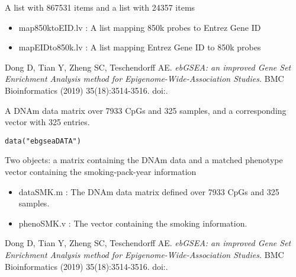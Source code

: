 \documentclass[letterpaper]{book}
\begin{document}
%
\begin{Format}
A list with 867531 items and a list with 24357 items
\end{Format}
%
\begin{Details}\relax
\begin{itemize}

\item{} map850ktoEID.lv : A list mapping 850k probes to Entrez Gene ID
\item{} mapEIDto850k.lv : A list mapping Entrez Gene ID to 850k probes

\end{itemize}

\end{Details}
%
\begin{References}\relax
Dong D, Tian Y, Zheng SC, Teschendorff AE.
\emph{ebGSEA: an improved Gene Set Enrichment Analysis method for Epigenome-Wide-Association Studies.}
BMC Bioinformatics (2019) 35(18):3514-3516.
doi:.
\end{References}
%
\begin{Description}\relax
A DNAm data matrix over 7933 CpGs and 325 samples, and a corresponding
vector with 325 entries.
\end{Description}
%
\begin{Usage}
\begin{verbatim}
data("ebgseaDATA")
\end{verbatim}
\end{Usage}
%
\begin{Format}
Two objects: a matrix containing the DNAm data and a matched phenotype
vector containing the smoking-pack-year information
\end{Format}
%
\begin{Details}\relax
\begin{itemize}

\item{} dataSMK.m : The DNAm data matrix defined over 7933 CpGs and 325 samples.
\item{} phenoSMK.v : The vector containing the smoking information.

\end{itemize}

\end{Details}
%
\begin{References}\relax
Dong D, Tian Y, Zheng SC, Teschendorff AE.
\emph{ebGSEA: an improved Gene Set Enrichment Analysis method for Epigenome-Wide-Association Studies.}
BMC Bioinformatics (2019) 35(18):3514-3516.
doi:.
\end{References}
\end{document}
